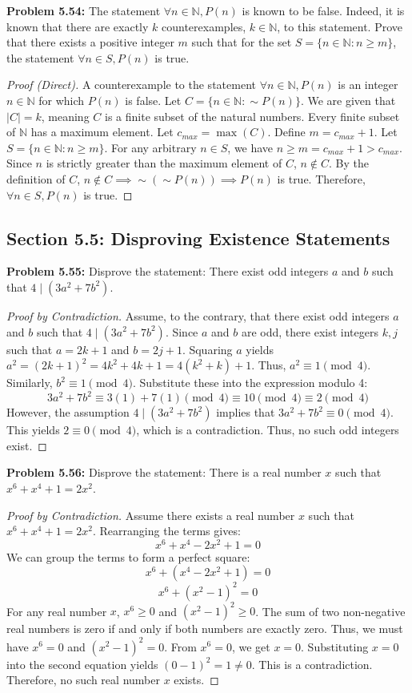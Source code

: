 \documentclass[11pt, a4paper]{article}
\theoremstyle{definition}
\theoremstyle{remark}
\newcommand{\N}{\mathbb{N}}
\begin{document}
\textbf{Problem 5.54:} The statement $\forall n \in \N, P(n)$ is known to be false. Indeed, it is known that there are exactly $k$ counterexamples, $k \in \N$, to this statement. Prove that there exists a positive integer $m$ such that for the set $S = \{n \in \N : n \ge m\}$, the statement $\forall n \in S, P(n)$ is true.
\begin{proof}[Proof (Direct)]
    A counterexample to the statement $\forall n \in \N, P(n)$ is an integer $n \in \N$ for which $P(n)$ is false. 
    Let $C = \{n \in \N : \sim P(n)\}$. We are given that $|C| = k$, meaning $C$ is a finite subset of the natural numbers.
    Every finite subset of $\N$ has a maximum element. Let $c_{max} = \max(C)$.
    Define $m = c_{max} + 1$. Let $S = \{n \in \N : n \ge m\}$.
    For any arbitrary $n \in S$, we have $n \ge m = c_{max} + 1 > c_{max}$. 
    Since $n$ is strictly greater than the maximum element of $C$, $n \notin C$. 
    By the definition of $C$, $n \notin C \implies \sim(\sim P(n)) \implies P(n)$ is true.
    Therefore, $\forall n \in S, P(n)$ is true.
\end{proof}

\subsection{Section 5.5: Disproving Existence Statements}

\textbf{Problem 5.55:} Disprove the statement: There exist odd integers $a$ and $b$ such that $4 \mid (3a^2 + 7b^2)$.
\begin{proof}[Proof by Contradiction]
    Assume, to the contrary, that there exist odd integers $a$ and $b$ such that $4 \mid (3a^2 + 7b^2)$.
    Since $a$ and $b$ are odd, there exist integers $k, j$ such that $a = 2k+1$ and $b = 2j+1$.
    Squaring $a$ yields $a^2 = (2k+1)^2 = 4k^2 + 4k + 1 = 4(k^2+k) + 1$. Thus, $a^2 \equiv 1 \pmod 4$.
    Similarly, $b^2 \equiv 1 \pmod 4$.
    Substitute these into the expression modulo 4:
    \[ 3a^2 + 7b^2 \equiv 3(1) + 7(1) \pmod 4 \equiv 10 \pmod 4 \equiv 2 \pmod 4 \]
    However, the assumption $4 \mid (3a^2 + 7b^2)$ implies that $3a^2 + 7b^2 \equiv 0 \pmod 4$.
    This yields $2 \equiv 0 \pmod 4$, which is a contradiction. Thus, no such odd integers exist.
\end{proof}

\textbf{Problem 5.56:} Disprove the statement: There is a real number $x$ such that $x^6 + x^4 + 1 = 2x^2$.
\begin{proof}[Proof by Contradiction]
    Assume there exists a real number $x$ such that $x^6 + x^4 + 1 = 2x^2$.
    Rearranging the terms gives:
    \[ x^6 + x^4 - 2x^2 + 1 = 0 \]
    We can group the terms to form a perfect square:
    \[ x^6 + (x^4 - 2x^2 + 1) = 0 \]
    \[ x^6 + (x^2 - 1)^2 = 0 \]
    For any real number $x$, $x^6 \ge 0$ and $(x^2 - 1)^2 \ge 0$. The sum of two non-negative real numbers is zero if and only if both numbers are exactly zero.
    Thus, we must have $x^6 = 0$ and $(x^2 - 1)^2 = 0$.
    From $x^6 = 0$, we get $x = 0$.
    Substituting $x = 0$ into the second equation yields $(0 - 1)^2 = 1 \neq 0$.
    This is a contradiction. Therefore, no such real number $x$ exists.
\end{proof}
\end{document}
